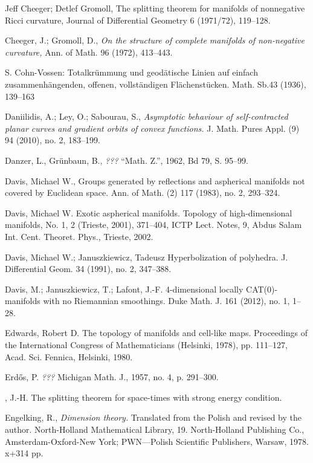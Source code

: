 \begin{thebibliography}{52}
Jeff Cheeger; Detlef Gromoll, The splitting theorem for manifolds of nonnegative Ricci curvature, Journal of Differential Geometry 6 (1971/72), 119--128.

  Cheeger, J.;  Gromoll, D., \textit{On the structure of complete manifolds of non-negative curvature,} Ann. of Math. 96 (1972), 413--443.


 S. Cohn-Vossen: Totalkr\"ummung und geod\"atische Linien auf einfach zusammenh\"angenden, offenen, vollst\"andigen Fl\"achenst\"ucken. Math. Sb.43 (1936), 139--163

Daniilidis, A.; Ley, O.; Sabourau, S.,
\textit{Asymptotic behaviour of self-contracted planar curves and gradient orbits of convex functions.}
J. Math. Pures Appl. (9) 94 (2010), no. 2, 183--199. 

Danzer, L., Gr\"unbaun, B., \textit{???} ``Math. Z.'',
1962, Bd 79, S. 95--99.

Davis, Michael W., Groups generated by reflections and aspherical manifolds not covered by Euclidean space.
Ann. of Math. (2) 117 (1983), no. 2, 293--324. 

 Davis, Michael W. Exotic aspherical manifolds. Topology of high-dimensional manifolds, No. 1, 2 (Trieste, 2001), 371--404, ICTP Lect. Notes, 9, Abdus Salam Int. Cent. Theoret. Phys., Trieste, 2002.

 Davis, Michael W.; Januszkiewicz, Tadeusz Hyperbolization of polyhedra. J. Differential Geom. 34 (1991), no. 2, 347--388.

Davis, M.; 
Januszkiewicz, T.; 
Lafont, J.-F.
4-dimensional locally CAT(0)-manifolds with no Riemannian smoothings. 
Duke Math. J. 161 (2012), no. 1, 1--28. 

 Edwards, Robert D.
The topology of manifolds and cell-like maps. Proceedings of the International Congress of Mathematicians (Helsinki, 1978), pp. 111--127, Acad. Sci. Fennica, Helsinki, 1980.

 Erd\H{o}s, P. \textit{???} Michigan Math. J., 1957, no. 4,
p. 291--300.

, J.-H. The splitting theorem for space-times with strong energy condition.

 Engelking, R., \textit{Dimension theory.} Translated from the Polish and revised by the author. North-Holland Mathematical Library, 19. North-Holland Publishing Co., Amsterdam-Oxford-New York; PWN---Polish Scientific Publishers, Warsaw, 1978. x+314 pp.


\end{thebibliography}
